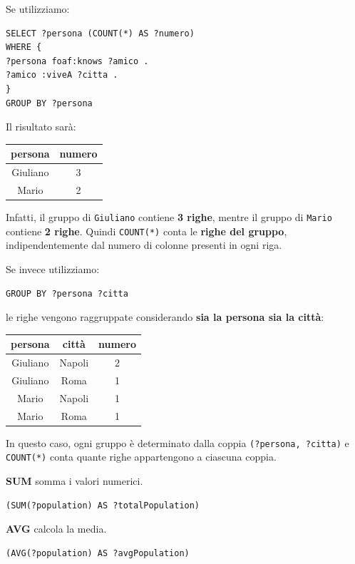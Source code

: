 Se utilizziamo:

\begin{verbatim}
SELECT ?persona (COUNT(*) AS ?numero)
WHERE {
?persona foaf:knows ?amico .
?amico :viveA ?citta .
}
GROUP BY ?persona
\end{verbatim}

Il risultato sarà:

\begin{center}
\begin{tabular}{c|c}
\textbf{persona} & \textbf{numero} \\
\hline
Giuliano & 3 \\
Mario & 2
\end{tabular}
\end{center}

Infatti, il gruppo di \texttt{Giuliano} contiene \textbf{3 righe}, mentre il gruppo di \texttt{Mario} contiene \textbf{2 righe}. Quindi \texttt{COUNT(*)} conta le \textbf{righe del gruppo}, indipendentemente dal numero di colonne presenti in ogni riga.

Se invece utilizziamo:

\begin{verbatim}
GROUP BY ?persona ?citta
\end{verbatim}

le righe vengono raggruppate considerando \textbf{sia la persona sia la città}:

\begin{center}
\begin{tabular}{c|c|c}
\textbf{persona} & \textbf{città} & \textbf{numero} \\
\hline
Giuliano & Napoli & 2 \\
Giuliano & Roma & 1 \\
Mario & Napoli & 1 \\
Mario & Roma & 1
\end{tabular}
\end{center}

In questo caso, ogni gruppo è determinato dalla coppia \texttt{(?persona, ?citta)} e \texttt{COUNT(*)} conta quante righe appartengono a ciascuna coppia.



\textbf{SUM} somma i valori numerici.
\begin{lstlisting}
(SUM(?population) AS ?totalPopulation)
\end{lstlisting}


\textbf{AVG}  calcola la media.
\begin{lstlisting}
(AVG(?population) AS ?avgPopulation)
\end{lstlisting}


